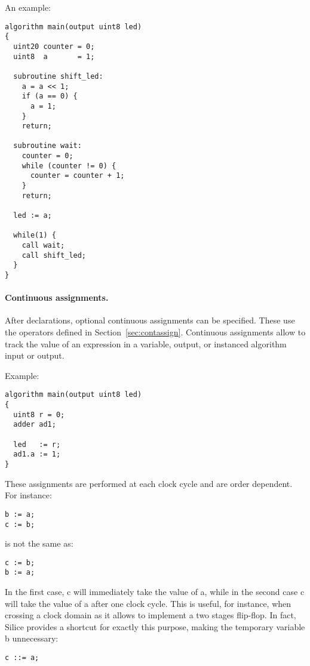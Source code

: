 \documentclass[a4]{article}
\newcommand\silice{Silice}
\begin{document}
An example:

\begin{verbatim}
algorithm main(output uint8 led)
{
  uint20 counter = 0;
  uint8  a       = 1;

  subroutine shift_led:
    a = a << 1;
    if (a == 0) {
      a = 1;
    }
    return;

  subroutine wait:
    counter = 0;
    while (counter != 0) {
      counter = counter + 1;
    }
    return;
    
  led := a;
  
  while(1) {
    call wait;
    call shift_led;
  }
}
\end{verbatim}


\paragraph{Continuous assignments.}

After declarations, optional continuous assignments can be specified.
These use the operators defined in Section~\ref{sec:contassign}.
%
Continuous assignments allow to track the value of an expression
in a variable, output, or instanced algorithm input or output.

\noindent Example:
\begin{verbatim}
algorithm main(output uint8 led)
{
  uint8 r = 0;
  adder ad1;

  led   := r;
  ad1.a := 1;
}
\end{verbatim}

\noindent These assignments are performed at each clock cycle and are order dependent. For instance:
\begin{verbatim}
b := a;
c := b;
\end{verbatim}
is not the same as:
\begin{verbatim}
c := b;
b := a;
\end{verbatim}
In the first case, c will immediately take the value of a, while in the second case
c will take the value of a after one clock cycle. This is useful, for instance, when
crossing a clock domain as it allows to implement a two stages flip-flop. In fact,
\silice{} provides a shortcut for exactly this purpose, making the temporary variable b unnecessary:

\begin{verbatim}
c ::= a;
\end{verbatim}
\end{document}
